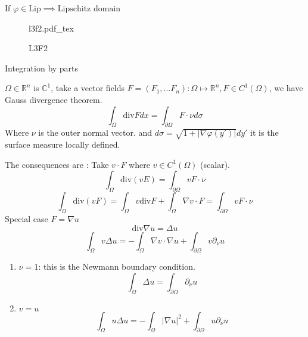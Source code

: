\documentclass[a4paper]{article}
\newcommand{\incfig}[1]{%
	\def\svgwidth{\columnwidth}
	{#1.pdf_tex}
}
\theoremstyle{definition}
\begin{document}
If $\varphi\in \text{Lip}\implies \text{Lipschitz domain}$
\begin{figure}[H]
    \centering
    \incfig{l3f2}
    \caption{L3F2}
    \label{fig:l3f2}
\end{figure}
Integration by parts

$\Omega \in  \mathbb{R}^{n} $ is $\mathbb{C}^{1}$, take a vector fields $F=\left( F_1,\ldots F_{n} \right): \Omega\mapsto \mathbb{R}^{n}, F\in C^{1}\left( \Omega \right) $, we have Gauss divergence theorem. 
\begin{equation}
	\int_\Omega \text{div}F dx=\int_{\partial \Omega}F\cdot \nu d\sigma
\end{equation} 
Where $\nu$ is the outer normal vector. and $d\sigma=\sqrt{1+\left|\nabla \varphi\left( y' \right)  \right| } dy'$ it is the surface measure locally defined. 

The consequences are :
	Take $v\cdot F$ where $v\in C^{1}\left( \Omega \right) $ (scalar). 
	\begin{equation}
		\int_\Omega\text{div}\left( vE \right) =\int_{\partial\Omega} vF\cdot \nu	
	\end{equation} 
\begin{equation}
		\int_{\Omega}^{}\text{div}\left( vF \right)   =\int_\Omega v\text{div} F+\int_\Omega \nabla v \cdot F=\int_{\partial\Omega}vF\cdot \nu
\end{equation} 
		Special case $F=\nabla u$
		\begin{equation}
			\text{div} \nabla u=\Delta u
		\end{equation} 
		\begin{equation}
			\int_\Omega v\Delta u=-\int_\Omega\nabla v\cdot \nabla u +\int_{\partial \Omega}v \partial_\nu u 
		\end{equation} 
		\begin{enumerate}
			\item $\nu=1$: this is the Newmann boundary condition.  
		\begin{equation}
			\int_\Omega\Delta u=\int_{\partial\Omega} \partial_{\nu}u
		\end{equation} 
	\item $v=u$
	 \begin{equation}
		 \int_{\Omega}^{}u \Delta u=-\int_\Omega\left|\nabla u \right|^2  +\int_{\partial\Omega} u\partial_\nu u
		\end{equation} 
		\end{enumerate}
		
\end{document}
